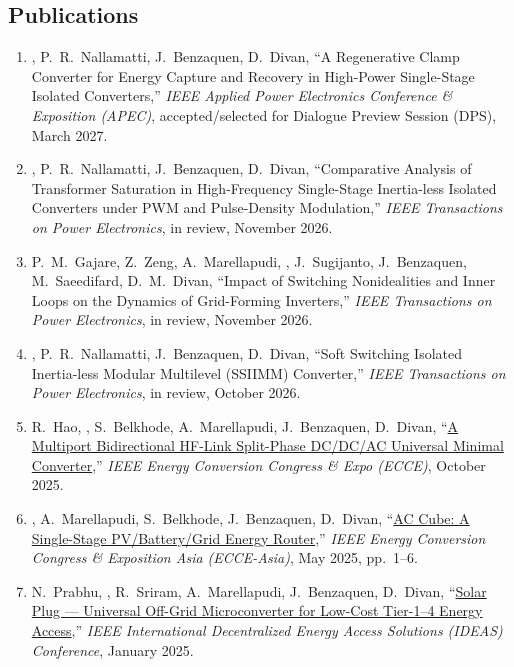 \subsection{Publications}

\begin{enumerate}
  \item {}, P.~R.~Nallamatti, J.~Benzaquen, D.~Divan, ``A
        Regenerative Clamp Converter for Energy Capture and Recovery in
        High-Power Single-Stage Isolated Converters,'' \textit{IEEE Applied
        Power Electronics Conference \& Exposition (APEC)}, accepted/selected
        for Dialogue Preview Session (DPS), March 2027.

  \item {}, P.~R.~Nallamatti, J.~Benzaquen, D.~Divan, ``Comparative
        Analysis of Transformer Saturation in High-Frequency Single-Stage
        Inertia-less Isolated Converters under PWM and Pulse-Density
        Modulation,'' \textit{IEEE Transactions on Power Electronics}, in
        review, November 2026.

  \item P.~M.~Gajare, Z.~Zeng, A.~Marellapudi, , J.~Sugijanto,
        J.~Benzaquen, M.~Saeedifard, D.~M.~Divan, ``Impact of Switching
        Nonidealities and Inner Loops on the Dynamics of Grid-Forming
        Inverters,'' \textit{IEEE Transactions on Power Electronics}, in
        review, November 2026.

  \item {}, P.~R.~Nallamatti, J.~Benzaquen, D.~Divan, ``Soft
        Switching Isolated Inertia-less Modular Multilevel (SSIIMM)
        Converter,'' \textit{IEEE Transactions on Power Electronics}, in
        review, October 2026.

  \item R.~Hao, , S.~Belkhode, A.~Marellapudi, J.~Benzaquen,
        D.~Divan, ``\href{https://doi.org/10.1109/ECCE58356.2025.11259542}{A
        Multiport Bidirectional HF-Link Split-Phase DC/DC/AC Universal Minimal
        Converter},'' \textit{IEEE Energy Conversion Congress \& Expo (ECCE)},
        October 2025.

  \item {}, A.~Marellapudi, S.~Belkhode, J.~Benzaquen, D.~Divan,
        ``\href{https://doi.org/10.1109/ECCE-Asia63110.2025.11111930}{AC Cube:
        A Single-Stage PV/Battery/Grid Energy Router},'' \textit{IEEE Energy
        Conversion Congress \& Exposition Asia (ECCE-Asia)}, May 2025,
        pp.~1--6.

  \item N.~Prabhu, , R.~Sriram, A.~Marellapudi, J.~Benzaquen,
        D.~Divan, ``\href{https://doi.org/10.1109/IDEAS62193.2025.11157522}{Solar
        Plug --- Universal Off-Grid Microconverter for Low-Cost Tier-1--4 Energy
        Access},'' \textit{IEEE International Decentralized Energy Access
        Solutions (IDEAS) Conference}, January 2025.
\end{enumerate}


